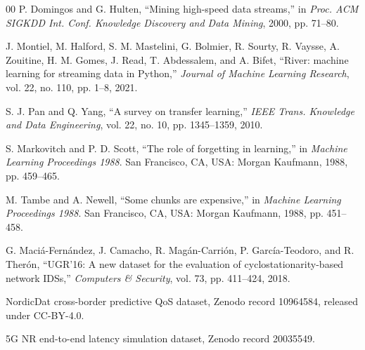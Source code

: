 \documentclass[conference]{IEEEtran}
\begin{document}
\begin{thebibliography}{00}
P. Domingos and G. Hulten, ``Mining high-speed data streams,'' in \emph{Proc. ACM
SIGKDD Int. Conf. Knowledge Discovery and Data Mining}, 2000, pp. 71--80.

J. Montiel, M. Halford, S. M. Mastelini, G. Bolmier, R. Sourty, R. Vaysse, A.
Zouitine, H. M. Gomes, J. Read, T. Abdessalem, and A. Bifet, ``River: machine
learning for streaming data in Python,'' \emph{Journal of Machine Learning
Research}, vol. 22, no. 110, pp. 1--8, 2021.

S. J. Pan and Q. Yang, ``A survey on transfer learning,'' \emph{IEEE Trans.
Knowledge and Data Engineering}, vol. 22, no. 10, pp. 1345--1359, 2010.

S. Markovitch and P. D. Scott, ``The role of forgetting in learning,'' in
\emph{Machine Learning Proceedings 1988}. San Francisco, CA, USA: Morgan Kaufmann,
1988, pp. 459--465.

M. Tambe and A. Newell, ``Some chunks are expensive,'' in \emph{Machine Learning
Proceedings 1988}. San Francisco, CA, USA: Morgan Kaufmann, 1988, pp. 451--458.

G. Maci\'a-Fern\'andez, J. Camacho, R. Mag\'an-Carri\'on, P. Garc\'ia-Teodoro, and
R. Ther\'on, ``UGR'16: A new dataset for the evaluation of cyclostationarity-based
network IDSs,'' \emph{Computers \& Security}, vol. 73, pp. 411--424, 2018.

NordicDat cross-border predictive QoS dataset, Zenodo record 10964584, released
under CC-BY-4.0.

5G NR end-to-end latency simulation dataset, Zenodo record 20035549.

\end{thebibliography}
\end{document}

